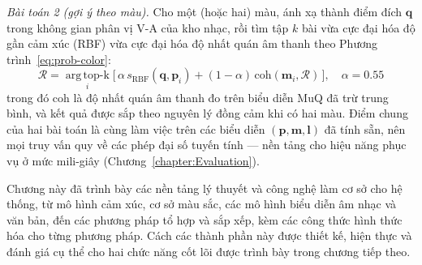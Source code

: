 \documentclass[../DoAn.tex]{subfiles}
\begin{document}
\textit{Bài toán 2 (gợi ý theo màu).} Cho một (hoặc hai) màu, ánh xạ thành điểm đích $\mathbf{q}$ trong không gian phân vị V-A của kho nhạc, rồi tìm tập $k$ bài vừa cực đại hóa độ gần cảm xúc (RBF) vừa cực đại hóa độ nhất quán âm thanh theo Phương trình~\eqref{eq:prob-color}:
\begin{equation}\label{eq:prob-color}
  \mathcal{R} = \operatorname*{arg\,top\text{-}k}_{i} \big[\,\alpha\, s_{\text{RBF}}(\mathbf{q}, \mathbf{p}_i) + (1-\alpha)\,\text{coh}(\mathbf{m}_i, \mathcal{R})\,\big], \quad \alpha = 0.55
\end{equation}
trong đó $\text{coh}$ là độ nhất quán âm thanh đo trên biểu diễn MuQ đã trừ trung bình, và kết quả được sắp theo nguyên lý đồng cảm khi có hai màu. Điểm chung của hai bài toán là cùng làm việc trên các biểu diễn $(\mathbf{p}, \mathbf{m}, \mathbf{l})$ đã tính sẵn, nên mọi truy vấn quy về các phép đại số tuyến tính --- nền tảng cho hiệu năng phục vụ ở mức mili-giây (Chương~\ref{chapter:Evaluation}).

Chương này đã trình bày các nền tảng lý thuyết và công nghệ làm cơ sở cho hệ thống, từ mô hình cảm xúc, cơ sở màu sắc, các mô hình biểu diễn âm nhạc và văn bản, đến các phương pháp tổ hợp và sắp xếp, kèm các công thức hình thức hóa cho từng phương pháp. Cách các thành phần này được thiết kế, hiện thực và đánh giá cụ thể cho hai chức năng cốt lõi được trình bày trong chương tiếp theo.
\end{document}
